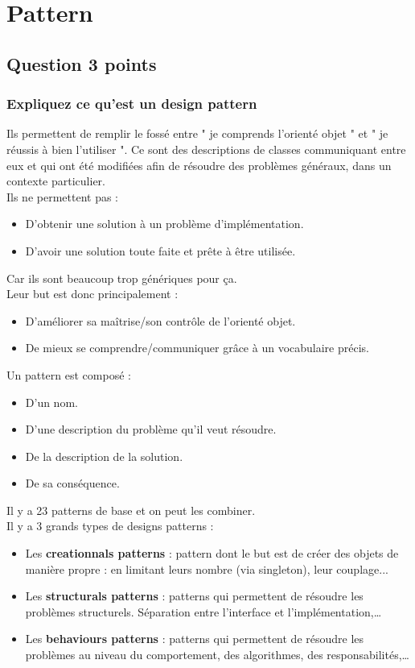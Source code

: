 \section{Pattern}



\subsection{Question 3 points}



\subsubsection{Expliquez ce qu'est un design pattern}
\textcolor[rgb]{0,0.48,0.58}{Ils permettent de remplir le fossé entre " je comprends l'orienté objet " et " je réussis à bien l'utiliser ". Ce sont des descriptions de classes communiquant entre eux et qui ont été modifiées afin de résoudre des problèmes généraux, dans un contexte particulier.
\\Ils ne permettent pas :
\begin{itemize}
	\item D'obtenir une solution à un problème d'implémentation.
	\item D'avoir une solution toute faite et prête à être utilisée.
\end{itemize}
Car ils sont beaucoup trop génériques pour ça.
\\Leur but est donc principalement :
\begin{itemize}
	\item D'améliorer sa maîtrise/son contrôle de l'orienté objet.
	\item De mieux se comprendre/communiquer grâce à un vocabulaire précis.
\end{itemize}
Un pattern est composé :
\begin{itemize}
	\item D'un nom.
	\item D'une description du problème qu'il veut résoudre.
	\item De la description de la solution.
	\item De sa conséquence.
\end{itemize}
Il y a 23 patterns de base et on peut les combiner.
\\Il y a 3 grands types de designs patterns :
\begin{itemize}
	\item Les \textbf{creationnals patterns} : pattern dont le but est de créer des objets de manière propre : en limitant leurs nombre (via singleton), leur couplage...
	\item Les \textbf{structurals patterns} : patterns qui permettent de résoudre les problèmes structurels. Séparation entre l'interface et l'implémentation,…
	\item Les \textbf{behaviours patterns} : patterns qui permettent de résoudre les problèmes au niveau du comportement, des algorithmes, des responsabilités,…
\end{itemize}}



